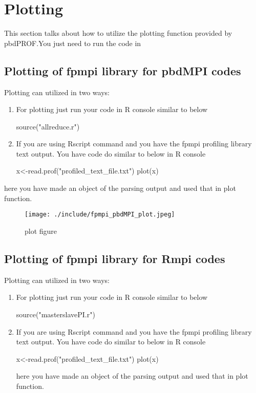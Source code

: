 \section{Plotting}
This section talks about how to utilize the plotting function provided by pbdPROF.You just need to run the code in 

\subsection{Plotting of fpmpi library for pbdMPI codes}
Plotting can utilized in two ways:
\begin{enumerate}
\item For plotting just run your code in R console similar to below 
\begin{Code}
source("allreduce.r")
\end{Code}
\item If you are using Rscript command and you have the fpmpi profiling library text output.
You have code do similar to below in R console
\begin{Code}
x<-read.prof("profiled_text_file.txt")
plot(x)
\end{Code}
\end{enumerate}
here you have made an object of the parsing output and used that in plot function.

\begin{figure}%
  \centering
  \texttt{[image: ./include/fpmpi\_pbdMPI\_plot.jpeg]}
  \caption{plot figure}
  \label{fig:plot_fpmpi}

\end{figure}


\subsection{Plotting of fpmpi library for Rmpi codes}
Plotting can utilized in two ways:
\begin{enumerate}
\item For plotting just run your code in R console similar to below 
\begin{Code}
source("masterslavePI.r")
\end{Code}
\item If you are using Rscript command and you have the fpmpi profiling library text output.
You have code do similar to below in R console
\begin{Code}
x<-read.prof("profiled_text_file.txt")
plot(x)
\end{Code}
here you have made an object of the parsing output and used that in plot function.
\end{enumerate}





